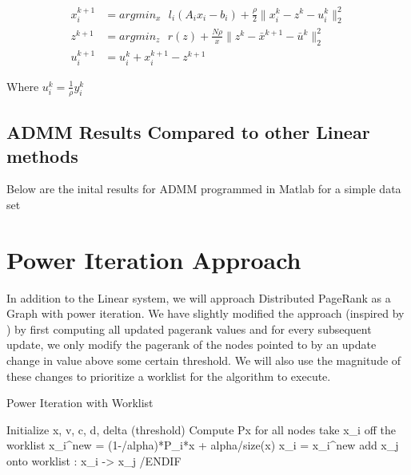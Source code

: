 \documentclass[a4paper,10pt]{article}
\begin{document}
\begin{center}
\begin{align}
	x_{i}^{k+1} &= argmin_{x} \: \: \: l_{i}(A_{i}x_{i} - b_{i}) + \frac{\rho}{2} \| x_{i}^{k} - z^{k} - u_{i}^{k} \|_{2}^{2} \\
	z^{k+1} &= argmin_{z} \: \: \: r(z) + \frac{N \rho}{x} \| z^{k} - \bar{x}^{k+1} - \bar{u}^{k} \|_{2}^{2} \\
	u_{i}^{k+1} &= u_{i}^{k} + x_{i}^{k+1} - z^{k+1}  
\end{align}
\end{center}
Where $u_{i}^{k} = \frac{1}{\rho} y_{i}^{k}$



\subsection{ADMM Results Compared to other Linear methods}
Below are the inital results for ADMM programmed in Matlab for a simple data set


\newpage
\section{Power Iteration Approach}
In addition to the Linear system, we will approach Distributed PageRank as a Graph with power iteration. We have slightly modified the approach (inspired by \cite{Joyce}) by first computing all updated pagerank values and for every subsequent update, we only modify the pagerank of the nodes pointed to by an update change in value above some certain threshold. We will also use the magnitude of these changes to prioritize a worklist for the algorithm to execute. 
\newline
\begin{algorithm}
\caption{Power Iteration with Worklist}
\begin{algorithmic}[1]
  \STATE Initialize x, v, c, d, delta (threshold)
  \STATE Compute Px for all nodes
    \STATE take x_{i} off the worklist
    \STATE x_{i}^{new} = (1-/alpha)*P_{i}*x + alpha/size(x)
		\STATE x_{i} = x_{i}^{new}
		\STATE add x_{j} onto worklist : \forall x_{i} -> x_{j}
	/ENDIF
  \ENDIF
  \ENDWHILE
\end{algorithmic}
\end{algorithm}
\newline
\end{document}
